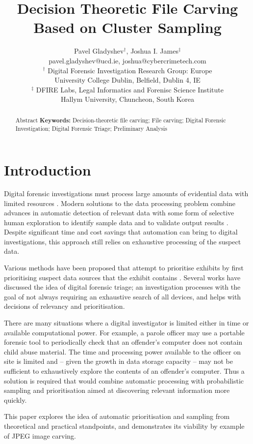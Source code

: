\documentclass[10pt,a4paper]{article}
\author{Pavel Gladyshev$^\dagger$, Joshua I. James$^\ddagger$\\
	pavel.gladyshev@ucd.ie, joshua@cybercrimetech.com\\
	$^\dagger$ Digital Forensic Investigation Research Group: Europe\\
	University College Dublin, Belfield, Dublin 4, IE\\
	$^\ddagger$ DFIRE Labs, Legal Informatics and Forenisc Science Institute\\
	Hallym University, Chuncheon, South Korea}
\title{Decision Theoretic File Carving Based on Cluster Sampling}
\date{}
\begin{document}
\maketitle

\begin{abstract}
\noindent Abstract
\noindent\textbf{Keywords:} Decision-theoretic file carving; File carving; Digital Forensic Investigation; Digital Forensic Triage; Preliminary Analysis
\end{abstract}

\section{Introduction}

Digital forensic investigations must process large amounts of evidential data with limited resources \cite{Casey2009, pollitt2013triage}. Modern solutions to the data processing problem combine advances in automatic detection of relevant data with some form of selective human exploration to identify sample data and to validate output results \cite{marturana2013machine, schell2007cyber, james2014measuring}. Despite significant time and cost savings that automation can bring to digital investigations, this approach still relies on exhaustive processing of the suspect data.

Various methods have been proposed that attempt to prioritise exhibits by first prioritising suspect data sources that the exhibit contains \cite{shaw2013practical, rogers2003role, overill2013triage}. Several works \cite{Koopmans2013,Casey2009} have discussed the idea of digital forensic triage; an investigation processes with the goal of not always requiring an exhaustive search of all devices, and helps with decisions of relevancy and prioritisation.

There are many situations where a digital investigator is limited either in time or available computational power. For example, a parole officer may use a portable forensic tool to periodically check that an offender's computer does not contain child abuse material. The time and processing power available to the officer on site is limited and -- given the growth in data storage capacity -- may not be sufficient to exhaustively explore the contents of an offender's computer. Thus a solution is required that would combine automatic processing with probabilistic sampling and prioritisation aimed at discovering relevant information more quickly.

This paper explores the idea of automatic prioritisation and sampling from theoretical and practical standpoints, and demonstrates its viability by example of JPEG image carving.
\end{document}

